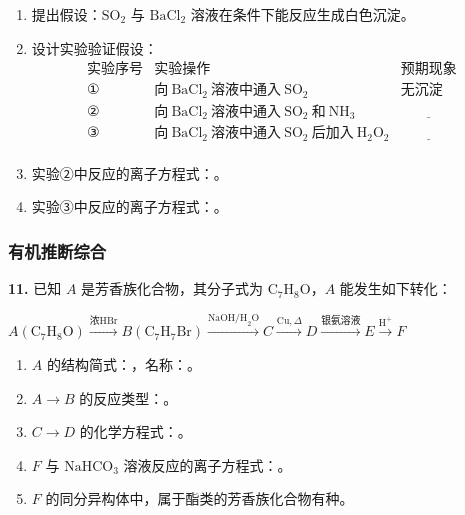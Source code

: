 \begin{enumerate}
  \item 提出假设：$\text{SO}_2$ 与 $\text{BaCl}_2$ 溶液在\underline{\qquad\qquad}条件下能反应生成白色沉淀。
  \item 设计实验验证假设：
  \[
  \begin{array}{c|c|c}
  \text{实验序号} & \text{实验操作} & \text{预期现象} \\ \hline
  ① & \text{向}\ \text{BaCl}_2\ \text{溶液中通入}\ \text{SO}_2 & \text{无沉淀} \\
  ② & \text{向}\ \text{BaCl}_2\ \text{溶液中通入}\ \text{SO}_2\ \text{和}\ \text{NH}_3 & \underline{\qquad\qquad} \\
  ③ & \text{向}\ \text{BaCl}_2\ \text{溶液中通入}\ \text{SO}_2\ \text{后加入}\ \text{H}_2\text{O}_2 & \underline{\qquad\qquad} \\
  \end{array}
  \]
  \item 实验②中反应的离子方程式：\underline{\qquad\qquad}。
  \item 实验③中反应的离子方程式：\underline{\qquad\qquad}。
\end{enumerate}

\subsubsection{有机推断综合}

\textbf{11.} 已知 $A$ 是芳香族化合物，其分子式为 $\text{C}_7\text{H}_8\text{O}$，$A$ 能发生如下转化：

$A(\text{C}_7\text{H}_8\text{O}) \xrightarrow{\text{浓HBr}} B(\text{C}_7\text{H}_7\text{Br}) \xrightarrow{\text{NaOH/H}_2\text{O}} C \xrightarrow{\text{Cu},\Delta} D \xrightarrow{\text{银氨溶液}} E \xrightarrow{\text{H}^+} F$

\begin{enumerate}
  \item $A$ 的结构简式：\underline{\qquad\qquad}，名称：\underline{\qquad\qquad}。
  \item $A \to B$ 的反应类型：\underline{\qquad\qquad}。
  \item $C \to D$ 的化学方程式：\underline{\qquad\qquad}。
  \item $F$ 与 $\text{NaHCO}_3$ 溶液反应的离子方程式：\underline{\qquad\qquad}。
  \item $F$ 的同分异构体中，属于酯类的芳香族化合物有\underline{\qquad\qquad}种。
\end{enumerate}

